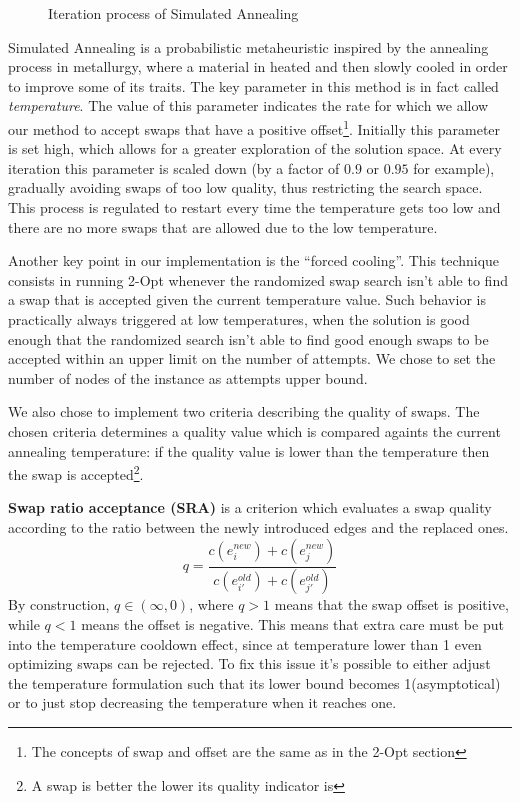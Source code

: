 \begin{figure}[htbp]
    \caption{Iteration process of Simulated Annealing}
    \label{fig:sa}
\end{figure}

Simulated Annealing is a probabilistic metaheuristic inspired by the annealing process in metallurgy, where a material in heated and then slowly cooled in order to improve some of its traits.
The key parameter in this method is in fact called \textit{temperature}.
The value of this parameter indicates the rate for which we allow our method to accept swaps that have a positive offset\footnote{The concepts of swap and offset are the same as in the 2-Opt section}.
Initially this parameter is set high, which allows for a greater exploration of the solution space.
At every iteration this parameter is scaled down (by a factor of $0.9$ or $0.95$ for example), gradually avoiding swaps of too low quality, thus restricting the search space. 
This process is regulated to restart every time the temperature gets too low and there are no more swaps that are allowed due to the low temperature.

Another key point in our implementation is the “forced cooling”.
This technique consists in running 2-Opt whenever the randomized swap search isn't able to find a swap that is accepted given the current temperature value.
Such behavior is practically always triggered at low temperatures, when the solution is good enough that the randomized search isn't able to find good enough swaps to be accepted within an upper limit on the number of attempts.
We chose to set the number of nodes of the instance as attempts upper bound.

We also chose to implement two criteria describing the quality of swaps.
The chosen criteria determines a quality value which is compared againts the current annealing temperature: if the quality value is lower than the temperature then the swap is accepted\footnote{A swap is better the lower its quality indicator is}.

\textbf{Swap ratio acceptance (SRA)} is a criterion which evaluates a swap quality according to the ratio between the newly introduced edges and the replaced ones.
\[
    q = \frac{c(e^{new}_i) + c(e^{new}_j)}{c(e^{old}_{i'}) + c(e^{old}_{j'})}
\]
By construction, $q \in (\infty,0)$, where $q > 1$ means that the swap offset is positive, while $q < 1$ means the offset is negative.
This means that extra care must be put into the temperature cooldown effect, since at temperature lower than 1 even optimizing swaps can be rejected.
To fix this issue it's possible to either adjust the temperature formulation such that its lower bound becomes 1(asymptotical) or to just stop decreasing the temperature when it reaches one.
 

